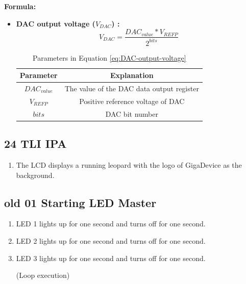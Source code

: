 \documentclass[12pt,a4paper]{ctexart}
\begin{document}
\textbf{Formula:}
\begin{itemize}
    \item \textbf{DAC output voltage ($V_{DAC}$) :}
          \begin{equation}
              V_{DAC}=\frac{DAC_{value}*V_{REFP}}{2^{bits}}
              \label{eq:DAC-output-voltage}
          \end{equation}
          \begin{table}[htbp]
              \centering
              \caption{Parameters in Equation \eqref{eq:DAC-output-voltage}}
              \begin{tabular}{|c|c|}
                  \hline
                  Parameter     & Explanation                               \\
                  \hline
                  $DAC_{value}$ & The value of the DAC data output register \\
                  \hline
                  $V_{REFP}$    & Positive reference voltage of DAC         \\
                  \hline
                  $bits$        & DAC bit number                            \\
                  \hline
              \end{tabular}
          \end{table}
\end{itemize}

\subsection{24 TLI IPA}

\begin{enumerate}
    \item The LCD displays a running leopard with the logo of GigaDevice as the background.
\end{enumerate}

\subsection{old 01 Starting LED Master}

\begin{enumerate}
    \item LED 1 lights up for one second and turns off for one second.
    \item LED 2 lights up for one second and turns off for one second.
    \item LED 3 lights up for one second and turns off for one second.
          
          (Loop execution)
\end{enumerate}
\end{document}

